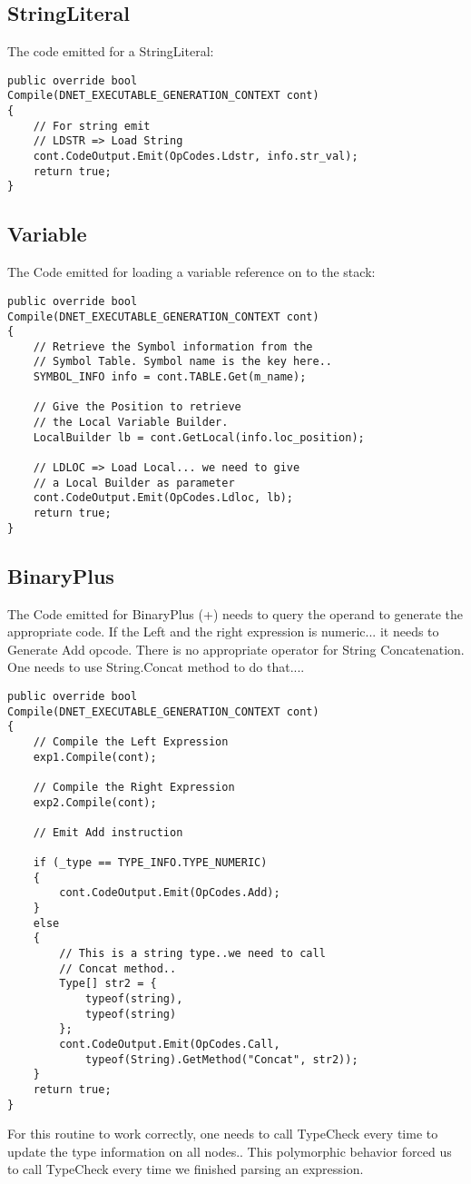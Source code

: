 \subsection{StringLiteral}
The code emitted for a StringLiteral:

\lstset{style=csharp}
\begin{lstlisting}
public override bool 
Compile(DNET_EXECUTABLE_GENERATION_CONTEXT cont)
{
	// For string emit
	// LDSTR => Load String
	cont.CodeOutput.Emit(OpCodes.Ldstr, info.str_val);
	return true;
}
\end{lstlisting}
\subsection{Variable}
The Code emitted for loading a variable reference on to the stack:
\lstset{style=csharp}
\begin{lstlisting}
public override bool 
Compile(DNET_EXECUTABLE_GENERATION_CONTEXT cont)
{
	// Retrieve the Symbol information from the
	// Symbol Table. Symbol name is the key here..
	SYMBOL_INFO info = cont.TABLE.Get(m_name);

	// Give the Position to retrieve 
	// the Local Variable Builder.
	LocalBuilder lb = cont.GetLocal(info.loc_position);

	// LDLOC => Load Local... we need to give
	// a Local Builder as parameter
	cont.CodeOutput.Emit(OpCodes.Ldloc, lb);
	return true;
}
\end{lstlisting}

\subsection{BinaryPlus}
The Code emitted for BinaryPlus (+) needs to query the operand to generate the appropriate code. If the Left and the right expression is numeric... it needs to Generate Add opcode. There is no appropriate operator for String Concatenation. One needs to use String.Concat method to do that....

\lstset{style=csharp}
\begin{lstlisting}
public override bool 
Compile(DNET_EXECUTABLE_GENERATION_CONTEXT cont)
{
	// Compile the Left Expression
	exp1.Compile(cont);
	
	// Compile the Right Expression
	exp2.Compile(cont);

	// Emit Add instruction

	if (_type == TYPE_INFO.TYPE_NUMERIC)
	{
		cont.CodeOutput.Emit(OpCodes.Add);
	}
	else
	{
		// This is a string type..we need to call
		// Concat method..
		Type[] str2 = {
			typeof(string),
			typeof(string)
		};
		cont.CodeOutput.Emit(OpCodes.Call,
			typeof(String).GetMethod("Concat", str2));
	}
	return true;
}
\end{lstlisting}
For this routine to work correctly, one needs to call TypeCheck every time to update the type information on all nodes.. This polymorphic behavior forced us to call TypeCheck every time we finished parsing an expression.

